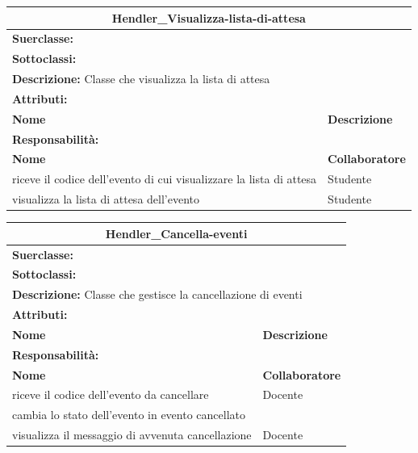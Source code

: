 \documentclass[11pt]{article}
\begin{document}
\begin{table}[H]
\centering
\begin{tabularx}{1\textwidth}{|X|X|}\hline
\multicolumn{2}{|c|}{\textbf{Hendler\_Visualizza-lista-di-attesa}}\\\hline
\multicolumn{2}{|l|}{\textbf{Suerclasse:}}\\\hline
\multicolumn{2}{|l|}{\textbf{Sottoclassi:}}\\\hline
\multicolumn{2}{|l|}{\textbf{Descrizione:} Classe che visualizza la lista di attesa}\\\hline
\multicolumn{2}{|l|}{\textbf{Attributi:}}\\
\textbf{Nome} & \textbf{Descrizione}\\
\hline
\multicolumn{2}{|l|}{\textbf{Responsabilità:}}\\
\textbf{Nome} & \textbf{Collaboratore}\\
riceve il codice dell'evento di cui visualizzare la lista di attesa & Studente\\
visualizza la lista di attesa dell'evento & Studente\\
\hline
\end{tabularx}
\end{table}


\begin{table}[H]
\centering
\begin{tabularx}{1\textwidth}{|X|X|}\hline
\multicolumn{2}{|c|}{\textbf{Hendler\_Cancella-eventi}}\\\hline
\multicolumn{2}{|l|}{\textbf{Suerclasse:}}\\\hline
\multicolumn{2}{|l|}{\textbf{Sottoclassi:}}\\\hline
\multicolumn{2}{|l|}{\textbf{Descrizione:} Classe che gestisce la cancellazione di eventi}\\\hline
\multicolumn{2}{|l|}{\textbf{Attributi:}}\\
\textbf{Nome} & \textbf{Descrizione}\\
\hline
\multicolumn{2}{|l|}{\textbf{Responsabilità:}}\\
\textbf{Nome} & \textbf{Collaboratore}\\
riceve il codice dell'evento da cancellare & Docente\\
cambia lo stato dell'evento in evento cancellato &\\
visualizza il messaggio di avvenuta cancellazione & Docente\\
\hline
\end{tabularx}
\end{table}
\end{document}
